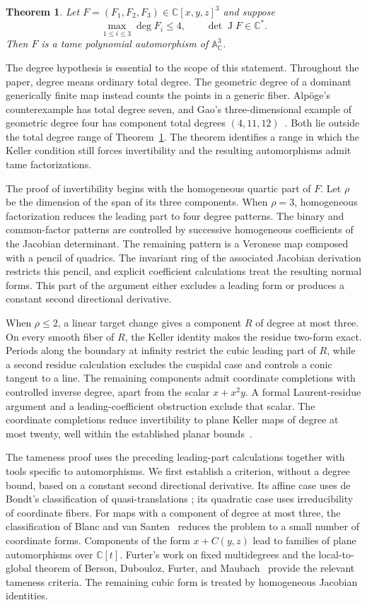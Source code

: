 \documentclass[11pt,reqno]{amsart}
\numberwithin{equation}{section}
\theoremstyle{plain}
\newtheorem{theorem}{Theorem}[section]
\theoremstyle{definition}
\theoremstyle{remark}
\newcommand{\C}{\mathbb C}
\newcommand{\A}{\mathbb A}
\newcommand{\J}{\operatorname J}
\begin{document}
\begin{theorem}\label{thm:combined}
Let $F=(F_1,F_2,F_3)\in\C[x,y,z]^3$ and suppose
\[
  \max_{1\le i\le3}\deg F_i\le4,
  \qquad \det\J F\in\C^*.
\]
Then $F$ is a tame polynomial automorphism of $\A^3_\C$.
\end{theorem}

The degree hypothesis is essential to the scope of this statement.
Throughout the paper, degree means ordinary total degree. The geometric
degree of a dominant generically finite map instead counts the points in a
generic fiber. Alp\"oge's counterexample has total degree seven, and
Gao's three-dimensional example of geometric degree four has component
total degrees $(4,11,12)$~\cite[Theorem~3.5]{Gao}. Both lie outside the
total degree range of Theorem~\ref{thm:combined}. The theorem identifies
a range in which the Keller condition still forces invertibility and
the resulting automorphisms admit tame factorizations.

The proof of invertibility begins with the homogeneous quartic part of
$F$. Let $\rho$ be the dimension of the span of its three components.
When $\rho=3$, homogeneous factorization reduces the leading part to four
degree patterns. The binary and common-factor patterns are controlled by
successive homogeneous coefficients of the Jacobian determinant. The
remaining pattern is a Veronese map composed with a pencil of quadrics.
The invariant ring of the associated Jacobian derivation restricts this
pencil, and explicit coefficient calculations treat the resulting normal
forms. This part of the argument either excludes a leading form or produces
a constant second directional derivative.

When $\rho\le2$, a linear target change gives a component $R$ of degree
at most three. On every smooth fiber of $R$, the Keller identity makes
the residue two-form exact. Periods along the boundary at infinity restrict
the cubic leading part of $R$, while a second residue calculation excludes
the cuspidal case and controls a conic tangent to a line. The remaining
components admit coordinate completions with controlled inverse degree,
apart from the scalar $x+x^2y$. A formal Laurent-residue argument and a
leading-coefficient obstruction exclude that scalar. The coordinate
completions reduce invertibility to plane Keller maps of degree at most
twenty, well within the established planar bounds~\cite{Moh,GGHV}.

The tameness proof uses the preceding leading-part calculations together
with tools specific to automorphisms. We first establish a criterion,
without a degree bound, based on a constant second directional derivative.
Its affine case uses de Bondt's classification of quasi-translations
\cite{QT}; its quadratic case uses irreducibility of coordinate fibers.
For maps with a component of degree at most three, the classification
of Blanc and van Santen~\cite{BVS} reduces the problem to a small number
of coordinate forms. Components of the form $x+C(y,z)$ lead to families
of plane automorphisms over $\C[t]$. Furter's work on fixed multidegrees
\cite{F} and the local-to-global theorem of Berson, Dubouloz, Furter,
and Maubach~\cite{BDFM} provide the relevant tameness criteria.
The remaining cubic form is treated by homogeneous Jacobian identities.
\end{document}
